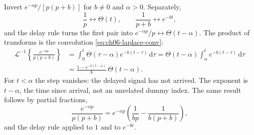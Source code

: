 \begin{example}
Invert $e^{-\alpha p}/[p(p+b)]$ for $b\neq 0$ and $\alpha>0$. Separately,
\begin{equation}
\frac{1}{p}\longleftrightarrow\Theta(t),
\qquad
\frac{1}{p+b}\longleftrightarrow e^{-bt},
\end{equation}
and the delay rule turns the first pair into $e^{-\alpha p}/p\longleftrightarrow\Theta(t-\alpha)$. The product of transforms is the convolution \eqref{eq:ch06-laplace-conv}:
\begin{align}
\mathcal{L}^{-1}\left\{\frac{e^{-\alpha p}}{p(p+b)}\right\}
&=\int_0^{t}\Theta(\tau-\alpha)e^{-b(t-\tau)}\,\mathrm{d}\tau
=\Theta(t-\alpha)\int_{\alpha}^{t}e^{-b(t-\tau)}\,\mathrm{d}\tau
\nonumber\\
&=\frac{1-e^{-b(t-\alpha)}}{b}\,\Theta(t-\alpha).
\end{align}
For $t<\alpha$ the step vanishes: the delayed signal has not arrived. The exponent is $t-\alpha$, the time since arrival, not an unrelated dummy index. The same result follows by partial fractions,
\begin{equation}
\frac{e^{-\alpha p}}{p(p+b)}
=e^{-\alpha p}\left(\frac{1}{bp}-\frac{1}{b(p+b)}\right),
\end{equation}
and the delay rule applied to $1$ and to $e^{-bt}$.
\end{example}
